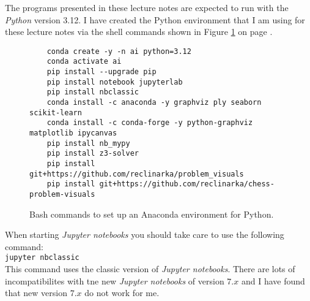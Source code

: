 \remark
The programs presented in these lecture notes are expected to run with the \textsl{Python} version 3.12.
I have created the Python environment that I am using for these lecture notes via the shell commands shown in
Figure \ref{fig:ai.sh} on page \pageref{fig:ai.sh}.

\begin{figure}[!ht]
\centering
\begin{verbatim}
    conda create -y -n ai python=3.12
    conda activate ai
    pip install --upgrade pip
    pip install notebook jupyterlab
    pip install nbclassic
    conda install -c anaconda -y graphviz ply seaborn scikit-learn 
    conda install -c conda-forge -y python-graphviz matplotlib ipycanvas 
    pip install nb_mypy
    pip install z3-solver
    pip install git+https://github.com/reclinarka/problem_visuals
    pip install git+https://github.com/reclinarka/chess-problem-visuals
\end{verbatim}
\vspace*{-0.3cm}
\caption{Bash commands to set up an Anaconda environment for Python.}
\label{fig:ai.sh}
\end{figure}

When starting \textsl{Jupyter notebooks} you should take care to use the following command:
\\[0.2cm]
\hspace*{1.3cm}
\texttt{jupyter nbclassic}
\\[0.2cm]
This command uses the classic version of \textsl{Jupyter notebooks}.  There are lots of incompatibilites with
tne new \textsl{Jupyter notebooks} of version $7.x$ and I have found that new version $7.x$ do not work for me.


